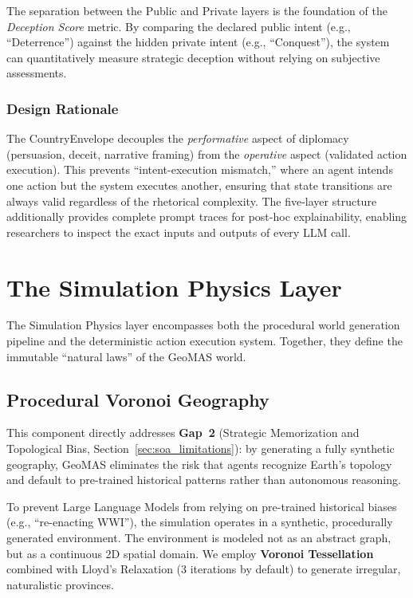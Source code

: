 The separation between the Public and Private layers is the foundation of the \textit{Deception Score} metric. By comparing the declared public intent (e.g., ``Deterrence'') against the hidden private intent (e.g., ``Conquest''), the system can quantitatively measure strategic deception without relying on subjective assessments.

\subsubsection{Design Rationale} The CountryEnvelope decouples the \textit{performative} aspect of diplomacy (persuasion, deceit, narrative framing) from the \textit{operative} aspect (validated action execution). This prevents ``intent-execution mismatch,'' where an agent intends one action but the system executes another, ensuring that state transitions are always valid regardless of the rhetorical complexity. The five-layer structure additionally provides complete prompt traces for post-hoc explainability, enabling researchers to inspect the exact inputs and outputs of every LLM call.


\section{The Simulation Physics Layer}
\label{sec:simulation_physics}
The Simulation Physics layer encompasses both the procedural world generation pipeline and the deterministic action execution system. Together, they define the immutable ``natural laws'' of the GeoMAS world.

\subsection{Procedural Voronoi Geography}
This component directly addresses \textbf{Gap~2} (Strategic Memorization and Topological Bias, Section~\ref{sec:soa_limitations}): by generating a fully synthetic geography, GeoMAS eliminates the risk that agents recognize Earth's topology and default to pre-trained historical patterns rather than autonomous reasoning.

To prevent Large Language Models from relying on pre-trained historical biases (e.g., ``re-enacting WWI''), the simulation operates in a synthetic, procedurally generated environment. The environment is modeled not as an abstract graph, but as a continuous 2D spatial domain. We employ \textbf{Voronoi Tessellation} combined with Lloyd's Relaxation (3 iterations by default) to generate irregular, naturalistic provinces.

